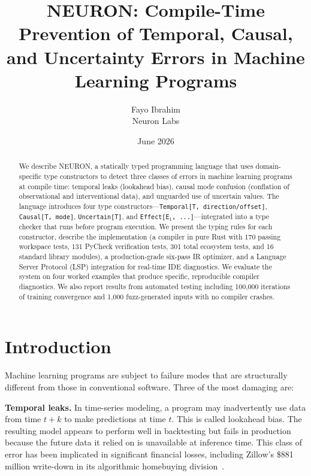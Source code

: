 \documentclass[11pt,a4paper]{article}
\title{\textbf{NEURON: Compile-Time Prevention of Temporal, Causal,\\and Uncertainty Errors in Machine Learning Programs}}
\author{Fayo Ibrahim \\ \small{Neuron Labs}}
\date{June 2026}
\newcommand{\ty}[1]{\texttt{#1}}
\begin{document}
\maketitle


\begin{abstract}
We describe NEURON, a statically typed programming language that uses domain-specific type constructors to detect three classes of errors in machine learning programs at compile time: temporal leaks (lookahead bias), causal mode confusion (conflation of observational and interventional data), and unguarded use of uncertain values. The language introduces four type constructors---\ty{Temporal[T, direction/offset]}, \ty{Causal[T, mode]}, \ty{Uncertain[T]}, and \ty{Effect[E$_1$, ...]}---integrated into a type checker that runs before program execution. We present the typing rules for each constructor, describe the implementation (a compiler in pure Rust with 170 passing workspace tests, 131 PyCheck verification tests, 301 total ecosystem tests, and 16 standard library modules), a production-grade six-pass IR optimizer, and a Language Server Protocol (LSP) integration for real-time IDE diagnostics. We evaluate the system on four worked examples that produce specific, reproducible compiler diagnostics. We also report results from automated testing including 100,000 iterations of training convergence and 1,000 fuzz-generated inputs with no compiler crashes.
\end{abstract}


\section{Introduction}

Machine learning programs are subject to failure modes that are structurally different from those in conventional software. Three of the most damaging are:

\textbf{Temporal leaks.} In time-series modeling, a program may inadvertently use data from time $t+k$ to make predictions at time $t$. This is called lookahead bias. The resulting model appears to perform well in backtesting but fails in production because the future data it relied on is unavailable at inference time. This class of error has been implicated in significant financial losses, including Zillow's \$881 million write-down in its algorithmic homebuying division~\cite{zillow2021}.
\end{document}
